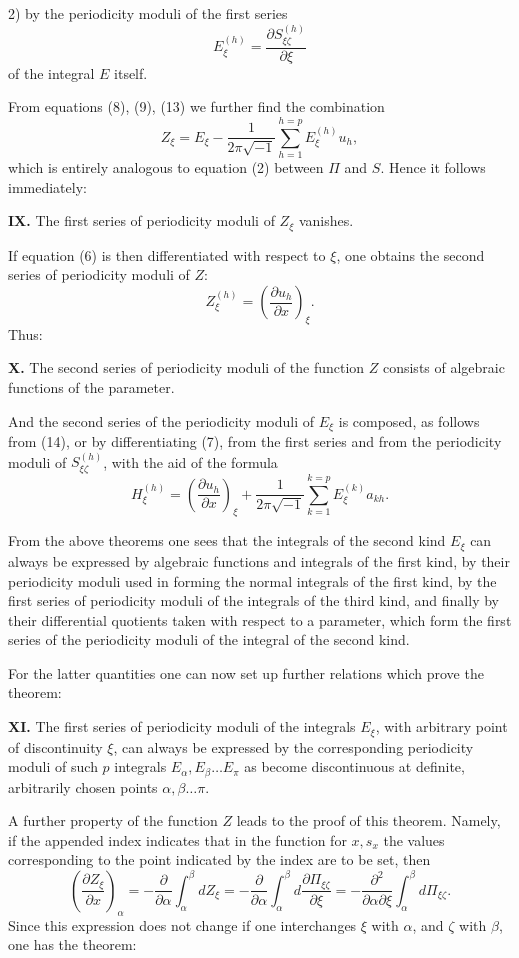\documentclass[10pt]{article}
\begin{document}
2) by the periodicity moduli of the first series
\[
\tag{13}
E_\xi^{(h)}=\frac{\partial S_{\xi\zeta}^{(h)}}{\partial \xi}
\]
of the integral \(E\) itself.

From equations (8), (9), (13) we further find the combination
\[
\tag{14}
Z_\xi=E_\xi-\frac{1}{2\pi\sqrt{-1}}\sum_{h=1}^{h=p}E_\xi^{(h)}u_h,
\]
which is entirely analogous to equation (2) between \(\Pi\) and \(S\). Hence it follows immediately:

\noindent\textbf{IX.} The first series of periodicity moduli of \(Z_\xi\) vanishes.

If equation (6) is then differentiated with respect to \(\xi\), one obtains the second series of periodicity moduli of \(Z\):
\[
\tag{15}
Z_\xi^{(h)}=\left(\frac{\partial u_h}{\partial x}\right)_\xi.
\]
Thus:

\noindent\textbf{X.} The second series of periodicity moduli of the function \(Z\) consists of algebraic functions of the parameter.

And the second series of the periodicity moduli of \(E_\xi\) is composed, as follows from (14), or by differentiating (7), from the first series and from the periodicity moduli of \(S_{\xi\zeta}^{(h)}\), with the aid of the formula
\[
\tag{16}
H_\xi^{(h)}=\left(\frac{\partial u_h}{\partial x}\right)_\xi
+\frac{1}{2\pi\sqrt{-1}}\sum_{k=1}^{k=p}E_\xi^{(k)}a_{kh}.
\]

From the above theorems one sees that the integrals of the second kind \(E_\xi\) can always be expressed by algebraic functions and integrals of the first kind, by their periodicity moduli used in forming the normal integrals of the first kind, by the first series of periodicity moduli of the integrals of the third kind, and finally by their differential quotients taken with respect to a parameter, which form the first series of the periodicity moduli of the integral of the second kind.

For the latter quantities one can now set up further relations which prove the theorem:

\noindent\textbf{XI.} The first series of periodicity moduli of the integrals \(E_\xi\), with arbitrary point of discontinuity \(\xi\), can always be expressed by the corresponding periodicity moduli of such \(p\) integrals \(E_\alpha,E_\beta\ldots E_\pi\) as become discontinuous at definite, arbitrarily chosen points \(\alpha,\beta\ldots\pi\).

A further property of the function \(Z\) leads to the proof of this theorem. Namely, if the appended index indicates that in the function for \(x,s_x\) the values corresponding to the point indicated by the index are to be set, then
\[
\left(\frac{\partial Z_\xi}{\partial x}\right)_\alpha
=-\frac{\partial}{\partial\alpha}\int_{\alpha}^{\beta}dZ_\xi
=-\frac{\partial}{\partial\alpha}\int_{\alpha}^{\beta}d\frac{\partial\Pi_{\xi\zeta}}{\partial\xi}
=-\frac{\partial^2}{\partial\alpha\partial\xi}\int_{\alpha}^{\beta}d\Pi_{\xi\zeta}.
\]
Since this expression does not change if one interchanges \(\xi\) with \(\alpha\), and \(\zeta\) with \(\beta\), one has the theorem:
\end{document}
